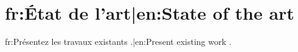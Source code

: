 \chapter{{{fr:État de l'art|en:State of the art}}}
\label{ch:etat-art}

{{fr:Présentez les travaux existants \parencite{lamport1994}.|en:Present existing work \parencite{lamport1994}.}}

